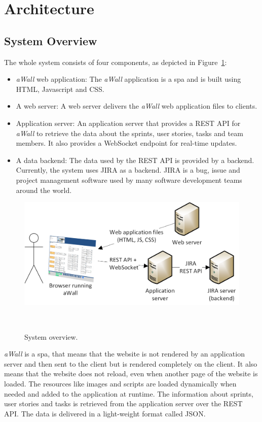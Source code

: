 \documentclass{sigchi}
\begin{document}
\section{Architecture}

\subsection{System Overview}

The whole system consists of four components, as depicted in Figure~\ref{fig:systemoverview}:
\begin{itemize}
	\item \textit{aWall} web application: The \textit{aWall} application is a \gls{spa} and is built using HTML, Javascript and CSS.
	\item A web server: A web server delivers the \textit{aWall} web application files to clients.
	\item Application server: An application server that provides a REST API for \textit{aWall} to retrieve the data about the sprints, user stories, tasks and team members.
	It also provides a WebSocket endpoint for real-time updates.
	\item A data backend: The data used by the REST API is provided by a backend. 
	Currently, the system uses JIRA \cite{jira} as a backend. JIRA is a bug, issue and project management software used by many software development teams around the world.
\end{itemize}

\begin{figure}[h]
	\centering
	\includegraphics[width=\columnwidth]{figures/systemoverview}
	\caption{System overview.}~\label{fig:systemoverview}
\end{figure}

\textit{aWall} is a \gls{spa}, that means that the website is not rendered by an application server and then sent to the client but is rendered completely on the client.
It also means that the website does not reload, even when another page of the website is loaded. 
The resources like images and scripts are loaded dynamically when needed and added to the application at runtime.
The information about sprints, user stories and tasks is retrieved from the application server over the REST API.
The data is delivered in a light-weight format called JSON. 
\end{document}
